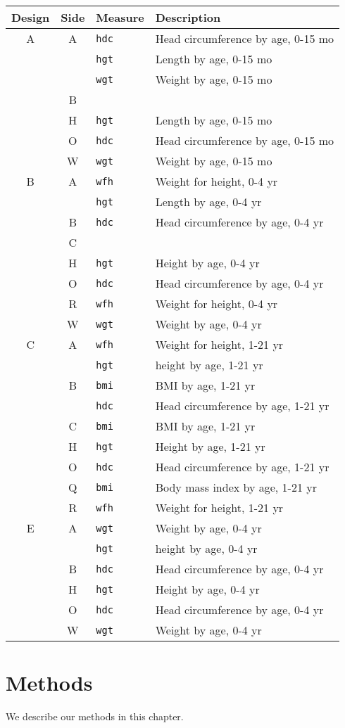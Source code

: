 \documentclass[]{book}
\begin{document}
\begin{longtable}[]{@{}ccll@{}}
\toprule
Design & Side & Measure & Description\tabularnewline
\midrule
\endhead
A & A & \texttt{hdc} & Head circumference by age, 0-15 mo\tabularnewline
& & \texttt{hgt} & Length by age, 0-15 mo\tabularnewline
& & \texttt{wgt} & Weight by age, 0-15 mo\tabularnewline
& B & &\tabularnewline
& H & \texttt{hgt} & Length by age, 0-15 mo\tabularnewline
& O & \texttt{hdc} & Head circumference by age, 0-15 mo\tabularnewline
& W & \texttt{wgt} & Weight by age, 0-15 mo\tabularnewline
B & A & \texttt{wfh} & Weight for height, 0-4 yr\tabularnewline
& & \texttt{hgt} & Length by age, 0-4 yr\tabularnewline
& B & \texttt{hdc} & Head circumference by age, 0-4 yr\tabularnewline
& C & &\tabularnewline
& H & \texttt{hgt} & Height by age, 0-4 yr\tabularnewline
& O & \texttt{hdc} & Head circumference by age, 0-4 yr\tabularnewline
& R & \texttt{wfh} & Weight for height, 0-4 yr\tabularnewline
& W & \texttt{wgt} & Weight by age, 0-4 yr\tabularnewline
C & A & \texttt{wfh} & Weight for height, 1-21 yr\tabularnewline
& & \texttt{hgt} & height by age, 1-21 yr\tabularnewline
& B & \texttt{bmi} & BMI by age, 1-21 yr\tabularnewline
& & \texttt{hdc} & Head circumference by age, 1-21 yr\tabularnewline
& C & \texttt{bmi} & BMI by age, 1-21 yr\tabularnewline
& H & \texttt{hgt} & Height by age, 1-21 yr\tabularnewline
& O & \texttt{hdc} & Head circumference by age, 1-21 yr\tabularnewline
& Q & \texttt{bmi} & Body mass index by age, 1-21 yr\tabularnewline
& R & \texttt{wfh} & Weight for height, 1-21 yr\tabularnewline
E & A & \texttt{wgt} & Weight by age, 0-4 yr\tabularnewline
& & \texttt{hgt} & height by age, 0-4 yr\tabularnewline
& B & \texttt{hdc} & Head circumference by age, 0-4 yr\tabularnewline
& H & \texttt{hgt} & Height by age, 0-4 yr\tabularnewline
& O & \texttt{hdc} & Head circumference by age, 0-4 yr\tabularnewline
& W & \texttt{wgt} & Weight by age, 0-4 yr\tabularnewline
\bottomrule
\end{longtable}

\hypertarget{methods}{%
\chapter{Methods}\label{methods}}

We describe our methods in this chapter.


\end{document}
